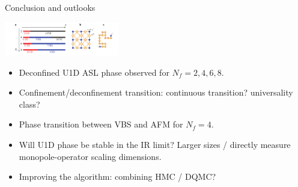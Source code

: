 \documentclass[xcolor=table, 10pt, aspectratio=169]{beamer}
\begin{document}
\begin{frame}{Conclusion and outlooks}
  \begin{center}
    \includegraphics[width=5cm]{phase-diagram}
  \end{center}
  \begin{itemize}
    \item Deconfined U1D ASL phase observed for $N_f=2,4,6,8$.
    \item Confinement/deconfinement transition: continuous transition? universality class?
    \item Phase transition between VBS and AFM for $N_f=4$.
    \item Will U1D phase be stable in the IR limit? Larger sizes / directly measure monopole-operator scaling dimensions.
    \item Improving the algorithm: combining HMC / DQMC?
  \end{itemize}
\end{frame}
\end{document}
